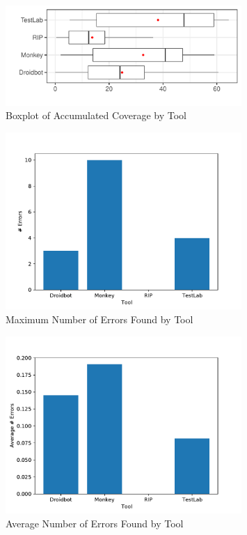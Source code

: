 \begin{figure}[h]
\centering
\includegraphics[width=0.8\textwidth]{../Figures/boxplotAccumulated.pdf}
\caption{Boxplot of Accumulated Coverage by Tool}\label{fig:boxplotAccumulated}
\end{figure}

\begin{figure}[h]
\centering
\includegraphics[width=0.8\textwidth]{../Figures/maxErrors.pdf}
\caption{Maximum Number of Errors Found by Tool}\label{fig:maxerrors}
\end{figure}

\begin{figure}[h]
\centering
\includegraphics[width=0.8\textwidth]{../Figures/averageErrors.pdf}
\caption{Average Number of Errors Found by Tool}\label{fig:averagaerrors}
\end{figure}

